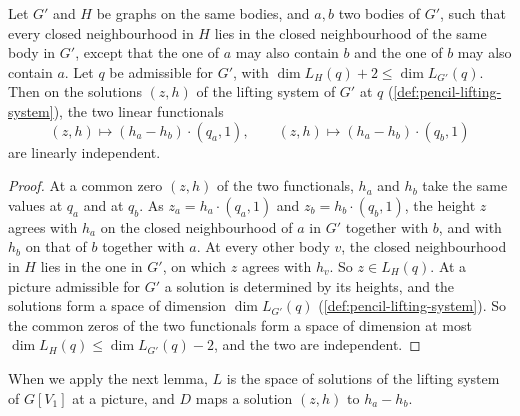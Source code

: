 \begin{lemma}
  \label{lem:pencil-flag-genericity}
  \leanok
  Let $G'$ and $H$ be graphs on the same bodies, and $a, b$ two bodies of
  $G'$, such that every closed neighbourhood in $H$ lies in the closed
  neighbourhood of the same body in $G'$, except that the one of $a$ may
  also contain $b$ and the one of $b$ may also contain $a$. Let $q$ be
  admissible for $G'$, with $\dim L_H(q) + 2 \le \dim L_{G'}(q)$. Then on
  the solutions $(z, h)$ of the lifting system of $G'$ at $q$
  (\cref{def:pencil-lifting-system}), the two linear functionals
  \[
    (z, h) \mapsto (h_a - h_b) \cdot (q_a, 1), \qquad
    (z, h) \mapsto (h_a - h_b) \cdot (q_b, 1)
  \]
  are linearly independent.
\end{lemma}
\begin{proof}
  \leanok
  At a common zero $(z, h)$ of the two functionals, $h_a$ and $h_b$ take
  the same values at $q_a$ and at $q_b$. As $z_a = h_a \cdot (q_a, 1)$ and
  $z_b = h_b \cdot (q_b, 1)$, the height $z$ agrees with $h_a$ on the
  closed neighbourhood of $a$ in $G'$ together with $b$, and with $h_b$ on
  that of $b$ together with $a$. At every other body $v$, the closed
  neighbourhood in $H$ lies in the one in $G'$, on which $z$ agrees with
  $h_v$. So $z \in L_H(q)$. At a picture admissible for $G'$ a solution is
  determined by its heights, and the solutions form a space of dimension
  $\dim L_{G'}(q)$ (\cref{def:pencil-lifting-system}). So the
  common zeros of the two functionals form a space of dimension at most
  $\dim L_H(q) \le \dim L_{G'}(q) - 2$, and the two are independent.
\end{proof}

When we apply the next lemma, $L$ is the space of solutions of the
lifting system of $G[V_1]$ at a picture, and $D$ maps a solution
$(z, h)$ to $h_a - h_b$.

